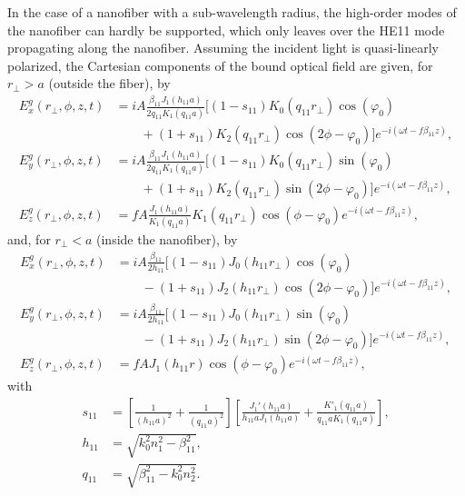 In the case of a nanofiber with a sub-wavelength radius, the high-order modes of the nanofiber can hardly be supported, which only leaves over the HE11 mode propagating along the nanofiber. Assuming the incident light is quasi-linearly polarized, the Cartesian components of the bound optical field are given, for $ r_\perp>a $ (outside the fiber), by~\cite{Lacroute2012,LeKien2004}
\begin{subequations}
\label{Ertrga}
\begin{align}
E_x^g(r_\perp,\phi,z,t) &= iA \frac{\beta_{11}J_1(h_{11}a)}{2q_{11}K_1(q_{11}a)}[(1-s_{11})K_0(q_{11}r_\perp)\cos (\varphi_0) \nonumber\\
&\qquad + (1+s_{11})K_2 (q_{11}r_\perp) \cos (2\phi-\varphi_0) ] e^{-i(\omega t-f\beta_{11}z)},\\
E_y^g(r_\perp,\phi,z,t) &= iA \frac{\beta_{11}J_1(h_{11}a)}{2q_{11}K_1(q_{11}a)}[(1-s_{11})K_0(q_{11}r_\perp)\sin (\varphi_0) \nonumber\\
&\qquad + (1+s_{11})K_2 (q_{11}r_\perp) \sin (2\phi-\varphi_0) ] e^{-i(\omega t-f\beta_{11}z)},\\
E_z^g(r_\perp,\phi,z,t) &= fA \frac{J_1(h_{11}a)}{K_1(q_{11}a)}K_1(q_{11}r_\perp)\cos (\phi-\varphi_0) e^{-i(\omega t-f\beta_{11}z)},
\end{align}
\end{subequations}
and, for $ r_\perp<a $ (inside the nanofiber), by
\begin{subequations}
\label{Ertrla}
\begin{align}
E_x^g(r_\perp,\phi,z,t) &= iA \frac{\beta_{11}}{2h_{11}}[(1-s_{11})J_0(h_{11}r_\perp)\cos (\varphi_0) \nonumber\\
&\qquad - (1+s_{11})J_2 (h_{11}r_\perp) \cos (2\phi-\varphi_0) ] e^{-i(\omega t-f\beta_{11}z)},\\
E_y^g(r_\perp,\phi,z,t) &= iA \frac{\beta_{11}}{2h_{11}}[(1-s_{11})J_0(h_{11}r_\perp)\sin (\varphi_0) \nonumber\\
&\qquad - (1+s_{11})J_2 (h_{11}r_\perp) \sin (2\phi-\varphi_0) ] e^{-i(\omega t-f\beta_{11}z)},\\
E_z^g(r_\perp,\phi,z,t) &= fA J_1(h_{11}r)\cos (\phi-\varphi_0) e^{-i(\omega t-f\beta_{11}z)},
\end{align}
\end{subequations}
with
\begin{subequations}
\begin{align}
s_{11} &= \left[\frac{1}{(h_{11}a)^2}+ \frac{1}{(q_{11}a)^2} \right] \left[ \frac{J_1'(h_{11}a)}{h_{11}aJ_1(h_{11}a)} + \frac{K'_1(q_{11}a)}{q_{11}aK_1(q_{11}a)} \right],\\
h_{11} &= \sqrt{k_0^2 n_1^2-\beta_{11}^2},\\
q_{11} &= \sqrt{\beta^2_{11}-k_0^2 n_2^2}.
\end{align}
\end{subequations}
